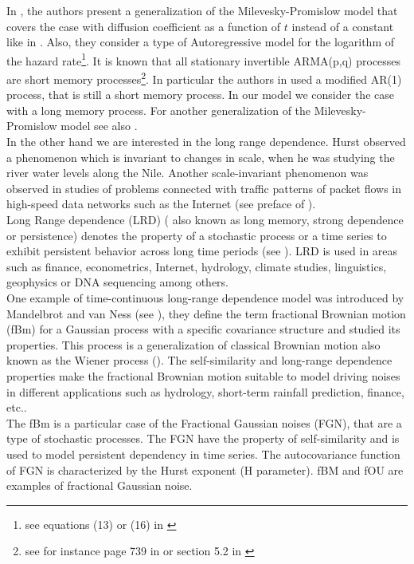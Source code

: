 \documentclass[smallextended]{svjour3}
\begin{document}
In \cite{gi-or-be}, the authors present a generalization of the 
Milevesky-Promislow model that covers the case with diffusion
coefficient as a function of $t$ instead of  a constant like in \cite{mi-pr}. 
Also, they consider a type of Autoregressive model
for the logarithm of the hazard rate\footnote{see equations (13) or (16) in 
\cite{gi-or-be}}. It is known that all stationary invertible
ARMA(p,q) processes are short memory processes\footnote{see for instance page 
739 in \cite{be-ye-fe-gh} or section 5.2
    in \cite{sh-st}}.
In particular the authors in  \cite{gi-or-be} used a modified AR(1) process, 
that is still a
short memory process. In our model we consider the case  with a long memory 
process. For another generalization of the Milevesky-Promislow model see also 
\cite{ro-le}. \\

In the other hand we are interested in the long range dependence.
Hurst \cite{hu} observed a phenomenon which is invariant to changes in scale, 
when
he was studying the river water levels along the Nile. Another scale-invariant 
phenomenon was observed in studies of problems connected with traffic patterns 
of packet
flows in high-speed data networks such as the Internet (see preface of 
\cite{ra}).\\



Long Range dependence (LRD) ( also known as long memory, strong dependence or 
persistence)
denotes the property of a stochastic process or a time series to exhibit 
persistent behavior across long time periods
(see \cite{ra}). LRD is used in areas such as finance, econometrics,
Internet, hydrology, climate studies, linguistics, geophysics or DNA sequencing 
among others. \\


One example of time-continuous long-range dependence model was introduced by
Mandelbrot and van Ness (see \cite{ma-va}), they define the term
fractional Brownian motion (fBm) for a Gaussian process with a specific 
covariance
structure and studied its properties. This process is a generalization of 
classical
Brownian motion also known as the Wiener process (\cite{ra}). The 
self-similarity and
long-range dependence properties make the fractional Brownian motion
suitable to model driving noises in different applications such as hydrology, 
short-term rainfall prediction, finance, etc.. \\

The fBm is a particular case of the Fractional Gaussian noises (FGN), that are 
a type of stochastic
processes. The FGN have the property of self-similarity and is
used to model persistent dependency in time series.
The autocovariance function of FGN is characterized by the Hurst exponent (H 
parameter).
fBM and fOU are examples of fractional Gaussian noise. \\
\end{document}
